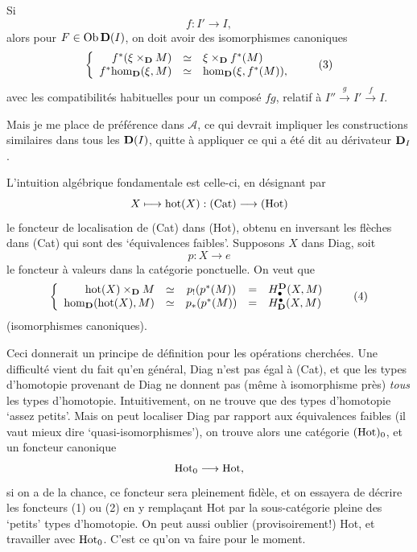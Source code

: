 Si
\[
f : I' \longrightarrow I,
\]
alors pour $F \in \mathrm{Ob}\,\mathbf{D}(I)$, on doit avoir des isomorphismes canoniques
\[
\left\{
\begin{array}{rcl}
f^*(\xi \times_{\D} M) & \simeq & \xi \times_{\D} f^*(M)\\
f^*\hm_{\D}(\xi, M) & \simeq & \hm_{\D}(\xi, f^*(M)),
\end{array}
\right.
\tag*{(3)}
\]
avec les compatibilités habituelles pour un composé $fg$, relatif à $I'' \xrightarrow{g} I' \xrightarrow{f} I$.

Mais je me place de préférence dans $\mathcal{A}$, ce qui devrait impliquer les constructions similaires dans tous les $\mathbf{D}(I)$, quitte à appliquer ce qui a été dit au dérivateur $\mathbf{D}_I$.

L'intuition algébrique fondamentale est celle-ci, en désignant par
\[
X \longmapsto \mathrm{hot}(X) : (\mathrm{Cat}) \longrightarrow (\mathrm{Hot})
\]
le foncteur de localisation de (Cat) dans (Hot), obtenu en inversant les flèches dans (Cat) qui sont des `équivalences faibles'. Supposons $X$ dans Diag, soit
\[
p : X \longrightarrow e
\]
le foncteur à valeurs dans la catégorie ponctuelle. On veut que
\[
\left\{
\begin{array}{rcccl}
\mathrm{hot}(X) \times_{\D} M & \simeq & p_!(p^*(M)) & = & H^{\D}_{\bullet}(X, M)\\
\hm_{\D}(\mathrm{hot}(X), M) & \simeq & p_*(p^*(M)) & = & H^{\bullet}_{\D}(X, M)
\end{array}
\right.
\tag*{(4)}
\]
(isomorphismes canoniques).

Ceci donnerait un principe de définition pour les opérations cherchées. Une difficulté vient du fait qu'en général, Diag n'est pas égal à (Cat), et que les types d'homotopie provenant de Diag ne donnent pas (même à isomorphisme près) \textit{tous} les types d'homotopie. Intuitivement, on ne trouve que des types d'homotopie `assez petits'. Mais on peut localiser Diag par rapport aux équivalences faibles (il vaut mieux dire `quasi-isomorphismes'), on trouve alors une catégorie $(\mathrm{Hot})_0$, et un foncteur canonique
\[
\mathrm{Hot}_0 \longrightarrow \mathrm{Hot},
\]
si on a de la chance, ce foncteur sera pleinement fidèle, et on essayera de décrire les foncteurs (1) ou (2) en y remplaçant Hot par la sous-catégorie pleine des `petits' types d'homotopie. On peut aussi oublier (provisoirement!) Hot, et travailler avec $\mathrm{Hot}_0$. C'est ce qu'on va faire pour le moment.

